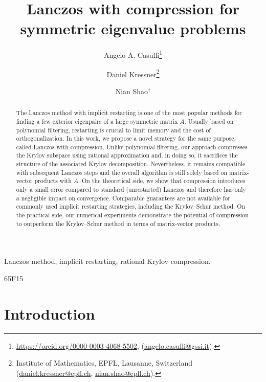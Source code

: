 \documentclass{siamart190516}
\providecommand{\edit}[1]{\textcolor{black}{#1}}
\begin{document}
\title{Lanczos with compression for symmetric eigenvalue problems}
 \author{
     Angelo A. Casulli\thanks{\href{https://orcid.org/0000-0003-4068-5502}{https://orcid.org/0000-0003-4068-5502}, 
         (\href{mailto:angelo.casulli@gssi.it}{angelo.casulli@gssi.it}).
     }\and
     Daniel Kressner\thanks{
         Institute of Mathematics, EPFL, Lausanne, Switzerland
         (\href{mailto:daniel.kressner@epfl.ch}{daniel.kressner@epfl.ch}, \href{mailto:nian.shao@epfl.ch}{nian.shao@epfl.ch}).
     }
     \and
     Nian Shao$^\dagger$
 }

\maketitle
\begin{abstract}
    The Lanczos method with implicit restarting is one of the most popular methods for finding a few exterior eigenpairs of a large symmetric matrix $A$. Usually based on polynomial filtering, restarting is crucial to limit memory and the cost of orthogonalization. 
    In this work, we propose a novel strategy for the same purpose, called Lanczos with compression. 
    Unlike polynomial filtering, our approach compresses the Krylov subspace using rational approximation and, in doing so, it sacrifices the structure of the associated Krylov decomposition. Nevertheless, it remains compatible with subsequent Lanczos steps and the overall algorithm is still solely based on matrix-vector products with $A$.
    On the theoretical side, we show that compression introduces only a small error compared to standard (unrestarted) Lanczos and therefore has only a negligible impact on convergence. Comparable guarantees are not available for commonly used implicit restarting strategies, including the Krylov--Schur method. On the practical side, our 
    numerical experiments demonstrate \edit{the potential of compression to} outperform the Krylov--Schur method in terms of matrix-vector products.
\end{abstract}
\begin{keywords}
Lanczos method, implicit restarting, rational Krylov compression.
\end{keywords} 
\begin{AMS}
    65F15  
\end{AMS}

\section{Introduction}
\end{document}
